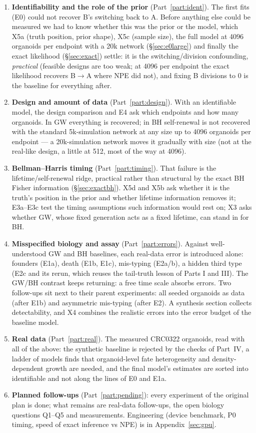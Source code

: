 \documentclass[10pt,a4paper]{article}
\newcommand{\sref}[1]{\S\ref{#1}}
\begin{document}
\begin{enumerate}[leftmargin=1.6em,label=\Roman*.]
\item \textbf{Identifiability and the role of the prior} (Part~\ref{part:ident}). The first fits (E0) could not recover B's switching back to A. Before anything else could be measured we had to know whether this was the prior or the model, which X5a (truth position, prior shape), X5c (sample size), the full model at 4096 organoids per endpoint with a 20k network (\sref{sec:e0large}) and finally the exact likelihood (\sref{sec:exact}) settle: it is the switching/division confounding, \emph{practical} (feasible designs are too weak; at 4096 per endpoint the exact likelihood recovers B$\to$A where NPE did not), and fixing B divisions to 0 is the baseline for everything after.
\item \textbf{Design and amount of data} (Part~\ref{part:design}). With an identifiable model, the design comparison and E4 ask which endpoints and how many organoids. In GW everything is recovered; in BH self-renewal is not recovered with the standard 5k-simulation network at any size up to 4096 organoids per endpoint --- a 20k-simulation network moves it gradually with size (not at the real-like design, a little at 512, most of the way at 4096).
\item \textbf{Bellman--Harris timing} (Part~\ref{part:timing}). That failure is the lifetime/self-renewal ridge, practical rather than structural by the exact BH Fisher information (\sref{sec:exactbh}). X5d and X5b ask whether it is the truth's position in the prior and whether lifetime information removes it; E3a--E3c test the timing assumptions such information would rest on; X3 asks whether GW, whose fixed generation acts as a fixed lifetime, can stand in for BH.
\item \textbf{Misspecified biology and assay} (Part~\ref{part:errors}). Against well-understood GW and BH baselines, each real-data error is introduced alone: founders (E1a), death (E1b, E1c), mis-typing (E2a/b), a hidden third type (E2c and its rerun, which reuses the tail-truth lesson of Parts I and III). The GW/BH contrast keeps returning: a free time scale absorbs errors. Two follow-ups sit next to their parent experiments: all seeded organoids as data (after E1b) and asymmetric mis-typing (after E2). A synthesis section collects detectability, and X4 combines the realistic errors into the error budget of the baseline model.
\item \textbf{Real data} (Part~\ref{part:real}). The measured CRC0322 organoids, read with all of the above: the synthetic baseline is rejected by the checks of Part~IV, a ladder of models finds that organoid-level fate heterogeneity and density-dependent growth are needed, and the final model's estimates are sorted into identifiable and not along the lines of E0 and E1a.
\item \textbf{Planned follow-ups} (Part~\ref{part:pending}): every experiment of the original plan is done; what remains are real-data follow-ups, the open biology questions Q1--Q5 and measurements. Engineering (device benchmark, P0 timing, speed of exact inference vs NPE) is in Appendix~\ref{sec:gpu}.
\end{enumerate}
\end{document}
